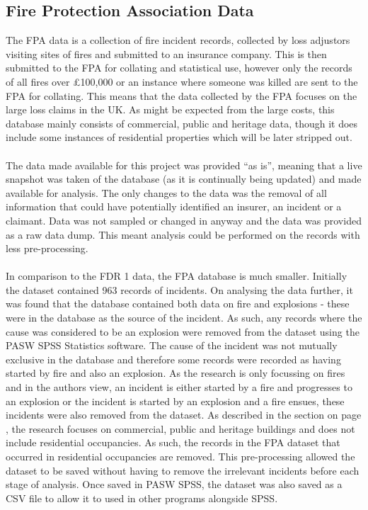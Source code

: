 \documentclass[table,a4paper,oneside]{book}
\begin{document}
\subsection{Fire Protection Association Data}
\label{sec:Fire Protection Association Data}
The \ac{FPA} data is a collection of fire incident records, collected by loss adjustors visiting sites of fires and submitted to an insurance company. This is then submitted to the \acl{FPA} for collating and statistical use, however only the records of all fires over \pounds 100,000 or an instance where someone was killed are sent to the \ac{FPA} for collating. This means that the data collected by the \ac{FPA} focuses on the large loss claims in the UK. As might be expected from the large costs, this database mainly consists of commercial, public and heritage data, though it does include some instances of residential properties which will be later stripped out.
\\
\\
The data made available for this project was provided ``as is'', meaning that a live snapshot was taken of the database (as it is continually being updated) and made available for analysis. The only changes to the data was the removal of all information that could have potentially identified an insurer, an incident or a claimant. Data was not sampled or changed in anyway and the data was provided as a raw data dump. This meant analysis could be performed on the records with less pre-processing.
\\
\\
In comparison to the FDR 1 data, the \ac{FPA} database is much smaller. Initially the dataset contained 963 records of incidents. On analysing the data further, it was found that the database contained both data on fire and explosions - these were in the database as the source of the incident. As such, any records where the cause was considered to be an explosion were removed from the dataset using the PASW SPSS Statistics software. The cause of the incident was not mutually exclusive in the database and therefore some records were recorded as having started by fire and also an explosion. As the research is only focussing on fires and in the authors view, an incident is either started by a fire and progresses to an explosion or the incident is started by an explosion and a fire ensues, these incidents were also removed from the dataset. As described in the  section on page \pageref{sec:FDR 1 Incident Records} , the research focuses on commercial, public and heritage buildings and does not include residential occupancies. As such, the records in the \ac{FPA} dataset that occurred in residential occupancies are removed. This pre-processing allowed the dataset to be saved without having to remove the irrelevant incidents before each stage of analysis. Once saved in PASW SPSS, the dataset was also saved as a \ac{CSV} file to allow it to used in other programs alongside SPSS.
\end{document}
